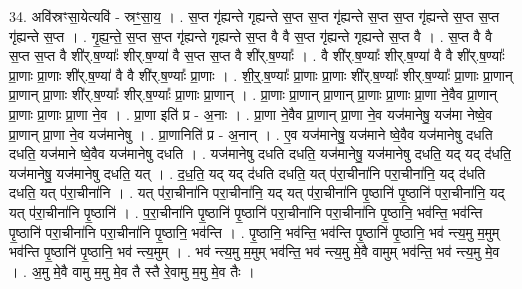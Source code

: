 \documentclass[17pt]{extarticle}
\begin{document}
34. अवि॑स्रꣳसा॒येत्यवि॑ - स्रꣳ॒॒सा॒य॒ । . स॒प्त गृ॑ह्यन्ते गृह्यन्ते स॒प्त स॒प्त गृ॑ह्यन्ते स॒प्त स॒प्त गृ॑ह्यन्ते स॒प्त स॒प्त गृ॑ह्यन्ते स॒प्त । . गृ॒ह्य॒न्ते॒ स॒प्त स॒प्त गृ॑ह्यन्ते गृह्यन्ते स॒प्त वै वै स॒प्त गृ॑ह्यन्ते गृह्यन्ते स॒प्त वै । . स॒प्त वै वै स॒प्त स॒प्त वै शी॑र्.ष॒ण्याः᳚ शीर्.ष॒ण्या॑ वै स॒प्त स॒प्त वै शी॑र्.ष॒ण्याः᳚ । . वै शी॑र्.ष॒ण्याः᳚ शीर्.ष॒ण्या॑ वै वै शी॑र्.ष॒ण्याः᳚ प्रा॒णाः प्रा॒णाः शी॑र्.ष॒ण्या॑ वै वै शी॑र्.ष॒ण्याः᳚ प्रा॒णाः । . शी॒र्॒.ष॒ण्याः᳚ प्रा॒णाः प्रा॒णाः शी॑र्.ष॒ण्याः᳚ शीर्.ष॒ण्याः᳚ प्रा॒णाः प्रा॒णान् प्रा॒णान् प्रा॒णाः शी॑र्.ष॒ण्याः᳚ शीर्.ष॒ण्याः᳚ प्रा॒णाः प्रा॒णान् । . प्रा॒णाः प्रा॒णान् प्रा॒णान् प्रा॒णाः प्रा॒णाः प्रा॒णा ने॒वैव प्रा॒णान् प्रा॒णाः प्रा॒णाः प्रा॒णा ने॒व । . प्रा॒णा इति॑ प्र - अ॒नाः । . प्रा॒णा ने॒वैव प्रा॒णान् प्रा॒णा ने॒व यज॑मानेषु॒ यज॑मा नेष्वे॒व प्रा॒णान् प्रा॒णा ने॒व यज॑मानेषु । . प्रा॒णानिति॑ प्र - अ॒नान् । . ए॒व यज॑मानेषु॒ यज॑माने ष्वे॒वैव यज॑मानेषु दधति दधति॒ यज॑माने ष्वे॒वैव यज॑मानेषु दधति । . यज॑मानेषु दधति दधति॒ यज॑मानेषु॒ यज॑मानेषु दधति॒ यद् यद् द॑धति॒ यज॑मानेषु॒ यज॑मानेषु दधति॒ यत् । . द॒ध॒ति॒ यद् यद् द॑धति दधति॒ यत् प॑रा॒चीना॑नि परा॒चीना॑नि॒ यद् द॑धति दधति॒ यत् प॑रा॒चीना॑नि । . यत् प॑रा॒चीना॑नि परा॒चीना॑नि॒ यद् यत् प॑रा॒चीना॑नि पृ॒ष्ठानि॑ पृ॒ष्ठानि॑ परा॒चीना॑नि॒ यद् यत् प॑रा॒चीना॑नि पृ॒ष्ठानि॑ । . प॒रा॒चीना॑नि पृ॒ष्ठानि॑ पृ॒ष्ठानि॑ परा॒चीना॑नि परा॒चीना॑नि पृ॒ष्ठानि॒ भव॑न्ति॒ भव॑न्ति पृ॒ष्ठानि॑ परा॒चीना॑नि परा॒चीना॑नि पृ॒ष्ठानि॒ भव॑न्ति । . पृ॒ष्ठानि॒ भव॑न्ति॒ भव॑न्ति पृ॒ष्ठानि॑ पृ॒ष्ठानि॒ भव॑ न्त्य॒मु म॒मुम् भव॑न्ति पृ॒ष्ठानि॑ पृ॒ष्ठानि॒ भव॑ न्त्य॒मुम् । . भव॑ न्त्य॒मु म॒मुम् भव॑न्ति॒ भव॑ न्त्य॒मु मे॒वै वामुम् भव॑न्ति॒ भव॑ न्त्य॒मु मे॒व । . अ॒मु मे॒वै वामु म॒मु मे॒व तै स्तै रे॒वामु म॒मु मे॒व तैः । \newline
\end{document}
